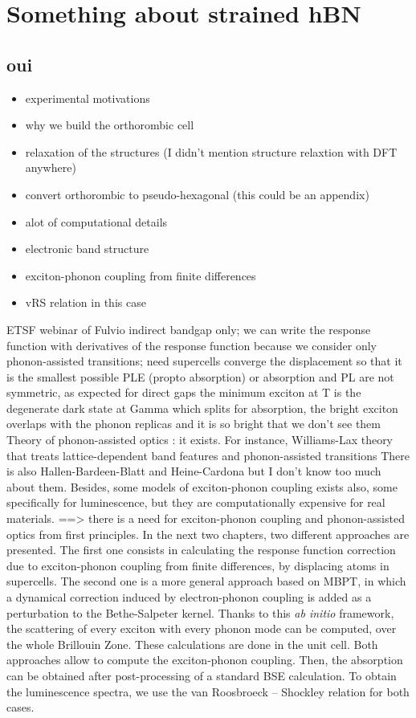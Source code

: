 \chapter{Something about strained hBN}
\chaptertoc{}

\section{oui}

\begin{itemize}
	\item experimental motivations
	\item why we build the orthorombic cell 
	\item relaxation of the structures (I didn't mention structure relaxtion with DFT anywhere)
	\item convert orthorombic to pseudo-hexagonal (this could be an appendix)
	\item alot of computational details
	\item electronic band structure 
	\item exciton-phonon coupling from finite differences
	\item vRS relation in this case 
\end{itemize}
%
%
ETSF webinar of Fulvio
indirect bandgap only; we can write the response function with derivatives of the response function because we consider only phonon-assisted transitions; need supercells
converge the displacement so that it is the smallest possible
PLE (propto absorption) or absorption and PL are not symmetric, as expected for direct gaps
the minimum exciton at T is the degenerate dark state at Gamma which splits
for absorption, the bright exciton overlaps with the phonon replicas and it is so bright that we don't see them 
%
%
Theory of phonon-assisted optics : it exists. For instance, Williams-Lax theory that treats lattice-dependent band features and phonon-assisted transitions 
There is also Hallen-Bardeen-Blatt and Heine-Cardona but I don't know too much about them.
Besides, some models of exciton-phonon coupling exists also, some specifically for luminescence, but they are computationally expensive for real materials.
==> there is a need for exciton-phonon coupling and phonon-assisted optics from first principles. In the next two chapters, two different approaches are presented. The first one consists in calculating the response function correction due to exciton-phonon coupling from finite differences, by displacing atoms in supercells. The second one is a more general approach based on \gls{MBPT}, in which a dynamical correction induced by electron-phonon coupling is added as a perturbation to the Bethe-Salpeter kernel. Thanks to this \textit{ab initio} framework, the scattering of every exciton with every phonon mode can be computed, over the whole Brillouin Zone. These calculations are done in the unit cell.
Both approaches allow to compute the exciton-phonon coupling. Then, the absorption can be obtained after post-processing of a standard \gls{BSE} calculation. To obtain the luminescence spectra, we use the van Roosbroeck -- Shockley relation for both cases.

